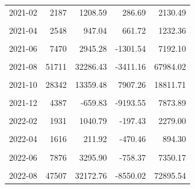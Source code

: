 \begin{longtable}[t]{crrrr}
2021-02 & 2187 & 1208.59 & 286.69 & 2130.49\\
\cellcolor{gray!10}{2021-03} & \cellcolor{gray!10}{2501} & \cellcolor{gray!10}{1095.03} & \cellcolor{gray!10}{418.08} & \cellcolor{gray!10}{1771.97}\\
2021-04 & 2548 & 947.04 & 661.72 & 1232.36\\
\cellcolor{gray!10}{2021-05} & \cellcolor{gray!10}{5288} & \cellcolor{gray!10}{2798.89} & \cellcolor{gray!10}{2234.08} & \cellcolor{gray!10}{3363.71}\\
2021-06 & 7470 & 2945.28 & -1301.54 & 7192.10\\
\cellcolor{gray!10}{2021-07} & \cellcolor{gray!10}{15985} & \cellcolor{gray!10}{6919.92} & \cellcolor{gray!10}{1363.01} & \cellcolor{gray!10}{12476.83}\\
2021-08 & 51711 & 32286.43 & -3411.16 & 67984.02\\
\cellcolor{gray!10}{2021-09} & \cellcolor{gray!10}{49829} & \cellcolor{gray!10}{26252.22} & \cellcolor{gray!10}{-6286.99} & \cellcolor{gray!10}{58791.44}\\
2021-10 & 28342 & 13359.48 & 7907.26 & 18811.71\\
\cellcolor{gray!10}{2021-11} & \cellcolor{gray!10}{11596} & \cellcolor{gray!10}{2734.57} & \cellcolor{gray!10}{-28270.42} & \cellcolor{gray!10}{33739.57}\\
2021-12 & 4387 & -659.83 & -9193.55 & 7873.89\\
\cellcolor{gray!10}{2022-01} & \cellcolor{gray!10}{2759} & \cellcolor{gray!10}{942.00} & \cellcolor{gray!10}{-499.28} & \cellcolor{gray!10}{2383.28}\\
2022-02 & 1931 & 1040.79 & -197.43 & 2279.00\\
\cellcolor{gray!10}{2022-03} & \cellcolor{gray!10}{1790} & \cellcolor{gray!10}{-116.39} & \cellcolor{gray!10}{-1451.20} & \cellcolor{gray!10}{1218.42}\\
2022-04 & 1616 & 211.92 & -470.46 & 894.30\\
\cellcolor{gray!10}{2022-05} & \cellcolor{gray!10}{6698} & \cellcolor{gray!10}{4284.56} & \cellcolor{gray!10}{3366.31} & \cellcolor{gray!10}{5202.82}\\
2022-06 & 7876 & 3295.90 & -758.37 & 7350.17\\
\cellcolor{gray!10}{2022-07} & \cellcolor{gray!10}{14212} & \cellcolor{gray!10}{5686.09} & \cellcolor{gray!10}{-665.09} & \cellcolor{gray!10}{12037.27}\\
2022-08 & 47507 & 32172.76 & -8550.02 & 72895.54\\

\end{longtable}
